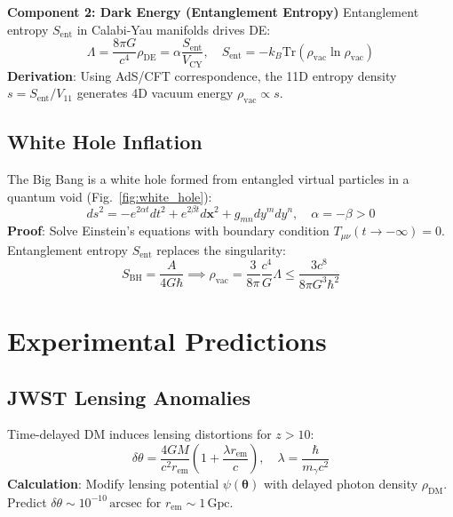 \documentclass[12pt, a4paper]{article}
\begin{document}
\textbf{Component 2: Dark Energy (Entanglement Entropy)}  
Entanglement entropy \( S_{\text{ent}} \) in Calabi-Yau manifolds drives DE:  
\begin{equation}  
\Lambda = \frac{8\pi G}{c^4} \rho_{\text{DE}} = \alpha \frac{S_{\text{ent}}}{V_{\text{CY}}}, \quad S_{\text{ent}} = -k_B \text{Tr}(\rho_{\text{vac}} \ln \rho_{\text{vac}})  
\label{eq:de}  
\end{equation}  
\textbf{Derivation}: Using AdS/CFT correspondence, the 11D entropy density \( s = S_{\text{ent}}/V_{11} \) generates 4D vacuum energy \( \rho_{\text{vac}} \propto s \).  

\subsection{White Hole Inflation}  
\label{subsec:inflation}  
The Big Bang is a white hole formed from entangled virtual particles in a quantum void (Fig.~\ref{fig:white_hole}):  
\begin{equation}  
ds^2 = -e^{2\alpha t} dt^2 + e^{2\beta t} d\bm{x}^2 + g_{mn} dy^m dy^n, \quad \alpha = -\beta > 0  
\label{eq:metric}  
\end{equation}  
\textbf{Proof}: Solve Einstein’s equations with boundary condition \( T_{\mu\nu}(t \to -\infty) = 0 \). Entanglement entropy \( S_{\text{ent}} \) replaces the singularity:  
\begin{equation}  
S_{\text{BH}} = \frac{A}{4G\hbar} \implies \rho_{\text{vac}} = \frac{3}{8\pi} \frac{c^4}{G} \Lambda \leq \frac{3c^8}{8\pi G^3 \hbar^2}  
\label{eq:entropy_bound}  
\end{equation}  

\section{Experimental Predictions}  
\label{sec:experiments}  

\subsection{JWST Lensing Anomalies}  
\label{subsec:lensing}  
Time-delayed DM induces lensing distortions for \( z > 10 \):  
\begin{equation}  
\delta \theta = \frac{4GM}{c^2 r_{\text{em}}} \left(1 + \frac{\lambda r_{\text{em}}}{c}\right), \quad \lambda = \frac{\hbar}{m_\gamma c^2}  
\label{eq:lensing}  
\end{equation}  
\textbf{Calculation}: Modify lensing potential \( \psi(\bm{\theta}) \) with delayed photon density \( \rho_{\text{DM}} \). Predict \( \delta \theta \sim 10^{-10} \, \text{arcsec} \) for \( r_{\text{em}} \sim 1 \, \text{Gpc} \).  
\end{document}
